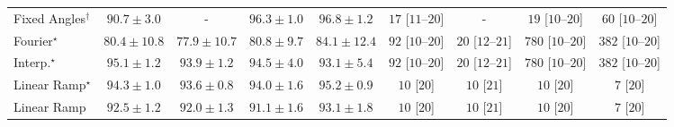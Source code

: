 \begin{tabular}{l|cccc|cccc|}
Fixed Angles$^\dagger$ & {\cellcolor[HTML]{045E94}} \color[HTML]{F1F1F1} $90.7\pm 3.0$ & {\cellcolor[HTML]{000000}} \color[HTML]{F1F1F1} {\cellcolor{white}} \color{black} - & {\cellcolor[HTML]{023E62}} \color[HTML]{F1F1F1} $96.3\pm 1.0$ & {\cellcolor[HTML]{023B5D}} \color[HTML]{F1F1F1} $96.8\pm 1.2$ & {\cellcolor[HTML]{FFF3F0}} \color[HTML]{000000} $17$ [$11$--$20$] & {\cellcolor[HTML]{000000}} \color[HTML]{F1F1F1} {\cellcolor{white}} \color{black} - & {\cellcolor[HTML]{FFF3F0}} \color[HTML]{000000} $19$ [$10$--$20$] & {\cellcolor[HTML]{FEE9E6}} \color[HTML]{000000} $60$ [$10$--$20$] \\
Fourier$^\star$ & {\cellcolor[HTML]{3790C0}} \color[HTML]{F1F1F1} $80.4\pm 10.8$ & {\cellcolor[HTML]{529BC7}} \color[HTML]{F1F1F1} $77.9\pm 10.7$ & {\cellcolor[HTML]{348EBF}} \color[HTML]{F1F1F1} $80.8\pm 9.7$ & {\cellcolor[HTML]{167BB6}} \color[HTML]{F1F1F1} $84.1\pm 12.4$ & {\cellcolor[HTML]{FDE2DF}} \color[HTML]{000000} $92$ [$10$--$20$] & {\cellcolor[HTML]{FFF3EF}} \color[HTML]{000000} $20$ [$12$--$21$] & {\cellcolor[HTML]{49006A}} \color[HTML]{F1F1F1} $780$ [$10$--$20$] & {\cellcolor[HTML]{F76CA3}} \color[HTML]{F1F1F1} $382$ [$10$--$20$] \\
Interp.$^\star$ & {\cellcolor[HTML]{03466E}} \color[HTML]{F1F1F1} $95.1\pm 1.2$ & {\cellcolor[HTML]{034C78}} \color[HTML]{F1F1F1} $93.9\pm 1.2$ & {\cellcolor[HTML]{034973}} \color[HTML]{F1F1F1} $94.5\pm 4.0$ & {\cellcolor[HTML]{045280}} \color[HTML]{F1F1F1} $93.1\pm 5.4$ & {\cellcolor[HTML]{FDE2DF}} \color[HTML]{000000} $92$ [$10$--$20$] & {\cellcolor[HTML]{FFF3EF}} \color[HTML]{000000} $20$ [$12$--$21$] & {\cellcolor[HTML]{49006A}} \color[HTML]{F1F1F1} $780$ [$10$--$20$] & {\cellcolor[HTML]{F76CA3}} \color[HTML]{F1F1F1} $382$ [$10$--$20$] \\
Linear Ramp$^\star$ & {\cellcolor[HTML]{034A74}} \color[HTML]{F1F1F1} $94.3\pm 1.0$ & {\cellcolor[HTML]{034E7B}} \color[HTML]{F1F1F1} $93.6\pm 0.8$ & {\cellcolor[HTML]{034C78}} \color[HTML]{F1F1F1} $94.0\pm 1.6$ & {\cellcolor[HTML]{03456C}} \color[HTML]{F1F1F1} $95.2\pm 0.9$ & {\cellcolor[HTML]{FFF6F2}} \color[HTML]{000000} $10$ [$20$] & {\cellcolor[HTML]{FFF6F2}} \color[HTML]{000000} $10$ [$21$] & {\cellcolor[HTML]{FFF6F2}} \color[HTML]{000000} $10$ [$20$] & {\cellcolor[HTML]{FFF6F2}} \color[HTML]{000000} $7$ [$20$] \\
Linear Ramp & {\cellcolor[HTML]{045585}} \color[HTML]{F1F1F1} $92.5\pm 1.2$ & {\cellcolor[HTML]{04588A}} \color[HTML]{F1F1F1} $92.0\pm 1.3$ & {\cellcolor[HTML]{045C90}} \color[HTML]{F1F1F1} $91.1\pm 1.6$ & {\cellcolor[HTML]{045280}} \color[HTML]{F1F1F1} $93.1\pm 1.8$ & {\cellcolor[HTML]{FFF6F2}} \color[HTML]{000000} $10$ [$20$] & {\cellcolor[HTML]{FFF6F2}} \color[HTML]{000000} $10$ [$21$] & {\cellcolor[HTML]{FFF6F2}} \color[HTML]{000000} $10$ [$20$] & {\cellcolor[HTML]{FFF6F2}} \color[HTML]{000000} $7$ [$20$] \\

\end{tabular}
